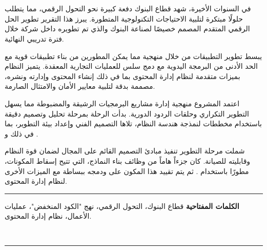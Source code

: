 
\chapter*{}

\begin{RLtext}
    في السنوات الأخيرة، شهد قطاع البنوك دفعة كبيرة نحو التحول الرقمي، مما يتطلب حلولًا مبتكرة لتلبية الاحتياجات التكنولوجية المتطورة. يبرز هذا التقرير تطوير  الحل الرقمي المتقدم المصمم خصيصًا لصناعة البنوك والذي تم تطويره داخل شركة  خلال فترة تدريبي النهائية.

    يبسط  تطوير التطبيقات من خلال منهجية  مما يمكن المطورين من بناء تطبيقات قوية مع الحد الأدنى من البرمجة اليدوية مع دمج سلس للعمليات التجارية المعقدة. يتميز النظام بميزات متقدمة لنظام إدارة المحتوى  بما في ذلك إنشاء المحتوى وإدارته ونشره، مصممة بدقة لتلبية معايير الأمان والامتثال الصارمة.

    اعتمد المشروع منهجية إدارة مشاريع البرمجيات الرشيقة والمضبوطة  مما يسهل التطوير التكراري وحلقات الردود الدورية. بدأت الرحلة بمرحلة تحليل وتصميم دقيقة باستخدام مخططات  لنمذجة هندسة النظام، تلاها التصميم الفني وإعداد بيئة التطوير، بما في ذلك  و .

    شملت مرحلة التطوير تنفيذ مبادئ التصميم القائم على المجال  لضمان قوة النظام وقابليته للصيانة. كان جزءاً هاماً من وظائف بناء النماذج، التي تتيح إسقاط المكونات، مطورًا باستخدام . ثم يتم تقييد هذا المكون على  ودمجه ببساطة مع الميزات الأخرى لنظام إدارة المحتوى.


\end{RLtext}

\noindent\rule[2pt]{\textwidth}{0.5pt}

\begin{RLtext}

    {\textbf{الكلمات المفتاحية}}
    قطاع البنوك، التحول الرقمي، نهج "الكود المنخفض"، عمليات الأعمال، نظام إدارة المحتوى.

    \\

\end{RLtext}

\noindent\rule[2pt]{\textwidth}{0.5pt}